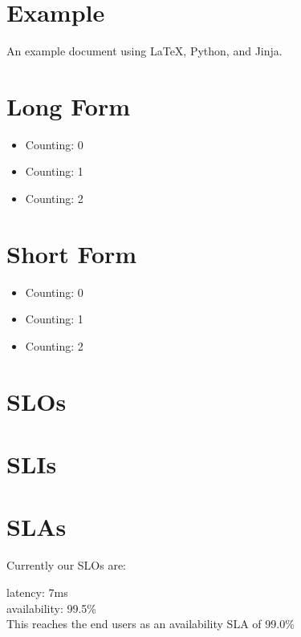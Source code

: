 \documentclass{article}
\begin{document}
\section{Example}
An example document using \LaTeX, Python, and Jinja.

\section{Long Form}
\begin{itemize}
  \item Counting: 0
  \item Counting: 1
  \item Counting: 2
\end{itemize}

\section{Short Form}

\begin{itemize}
  \item Counting: 0
  \item Counting: 1
  \item Counting: 2
\end{itemize}

\section{SLOs}
\section{SLIs}
\section{SLAs}

Currently our SLOs are:

latency: 7ms\\
availability: 99.5\%\\

This reaches the end users as an availability SLA of 99.0\%
\end{document}
